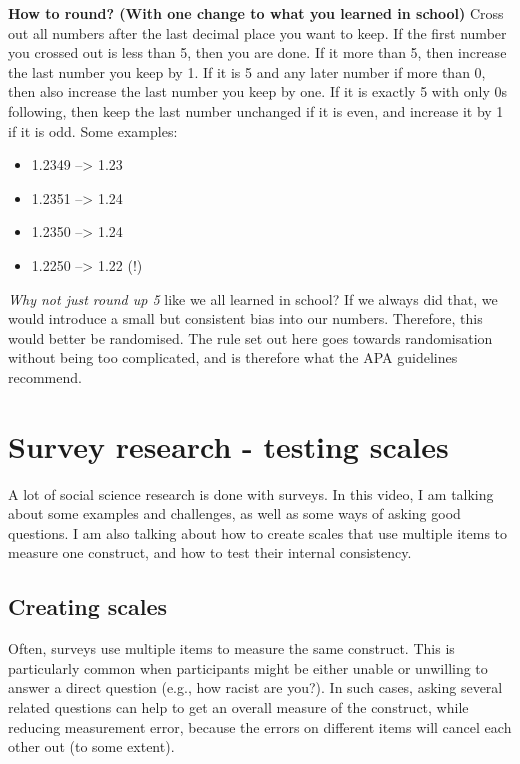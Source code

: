 \documentclass[
]{book}
\providecommand{\tightlist}{%
  \setlength{\itemsep}{0pt}\setlength{\parskip}{0pt}}
\begin{document}
\textbf{How to round? (With one change to what you learned in school)} Cross out all numbers after the last decimal place you want to keep. If the first number you crossed out is less than 5, then you are done. If it more than 5, then increase the last number you keep by 1. If it is 5 and any later number if more than 0, then also increase the last number you keep by one. If it is exactly 5 with only 0s following, then keep the last number unchanged if it is even, and increase it by 1 if it is odd. Some examples:

\begin{itemize}
\tightlist
\item
  1.2349 --\textgreater{} 1.23
\item
  1.2351 --\textgreater{} 1.24
\item
  1.2350 --\textgreater{} 1.24
\item
  1.2250 --\textgreater{} 1.22 (!)
\end{itemize}

\emph{Why not just round up 5} like we all learned in school? If we always did that, we would introduce a small but consistent bias into our numbers. Therefore, this would better be randomised. The rule set out here goes towards randomisation without being too complicated, and is therefore what the APA guidelines recommend.

\hypertarget{survey-research---testing-scales}{%
\chapter{Survey research - testing scales}\label{survey-research---testing-scales}}

A lot of social science research is done with surveys. In this video, I am talking about some examples and challenges, as well as some ways of asking good questions. I am also talking about how to create scales that use multiple items to measure one construct, and how to test their internal consistency.

\hypertarget{creating-scales}{%
\section{Creating scales}\label{creating-scales}}

Often, surveys use multiple items to measure the same construct. This is particularly common when participants might be either unable or unwilling to answer a direct question (e.g., how racist are you?). In such cases, asking several related questions can help to get an overall measure of the construct, while reducing measurement error, because the errors on different items will cancel each other out (to some extent).
\end{document}
